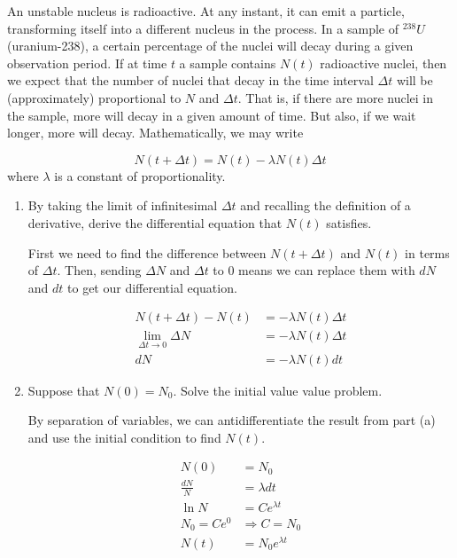 \documentclass[11pt,answers]{exam}
\begin{document}
\begin{questions}

\addtocounter{question}{8}

\question
An unstable nucleus is radioactive. At any instant, it can emit a particle, transforming itself into a different nucleus in the process. In a sample of $^{238} U$ (uranium-238), a certain percentage of the nuclei will decay during a given observation period. If at time $t$ a sample contains $N(t)$ radioactive nuclei, then we expect that the number of nuclei that decay in the time interval $\Delta t$ will be (approximately) proportional to $N$ and $\Delta t$. That is, if there are more nuclei in the sample, more will decay in a given amount of time. But also, if we wait longer, more will decay. Mathematically, we may write

\[
N(t + \Delta t) = N(t) - \lambda N(t) \Delta t
\]
where $\lambda$ is a constant of proportionality.

\begin{enumerate}
\item By taking the limit of infinitesimal $\Delta t$ and recalling the definition of a derivative, derive the differential equation that $N(t)$ satisfies.
\begin{solution}

First we need to find the difference between $N(t + \Delta t)$ and $N(t)$ in terms of $\Delta t$.  Then, sending $\Delta N$ and $\Delta t$ to 0 means we can replace them with $dN$ and $dt$ to get our differential equation.

\begin{align*}
N(t + \Delta t) - N(t) &= - \lambda N(t)\Delta t \\
\lim_{\Delta t \to 0} \Delta N &= -\lambda N(t) \Delta t \\
dN &= -\lambda N(t) dt
\end{align*}

\end{solution}


\item Suppose that $N(0) = N_0$. Solve the initial value value problem.
\begin{solution}

By separation of variables, we can antidifferentiate the result from part (a) and use the initial condition to find $N(t)$.

\begin{align*}
N(0) &= N_0\\
\frac{dN}{N} &= \lambda dt \\
\ln{N} &= Ce^{\lambda t} \\
N_0 = Ce^0 &\Rightarrow C = N_0 \\
N(t) &= N_0e^{\lambda t}
\end{align*}
\end{solution}


\end{enumerate}
\end{questions}
\end{document}
